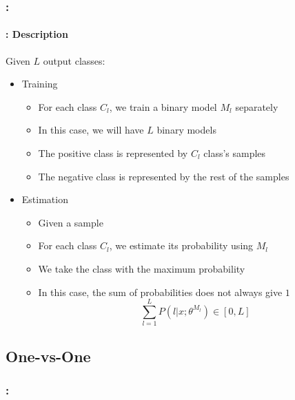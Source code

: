 \documentclass[xcolor=table]{beamer}
\begin{document}
\begin{frame}
	\frametitle{\insertshortsubtitle: \insertsection}
	\framesubtitle{\insertsubsection: Description}
	
	Given $L$ output classes:
	\begin{itemize}
		\item Training
		\begin{itemize}
			\item For each class $C_l$, we train a binary model $M_l$ separately
			\item In this case, we will have $L$ binary models
			\item The positive class is represented by $C_l$ class's samples
			\item The negative class is represented by the rest of the samples
		\end{itemize}
		\item Estimation
		\begin{itemize}
			\item Given a sample
			\item For each class $C_l$, we estimate its probability using $M_l$
			\item We take the class with the maximum probability
			\item In this case, the sum of probabilities does not always give $1$
			\[\sum_{l=1}^{L} P(l|x; \theta^{M_l}) \in [0, L]\]
		\end{itemize}
	\end{itemize}
	
\end{frame}

\subsection{One-vs-One}

\begin{frame}
	\frametitle{\insertshortsubtitle: \insertsection}
	\framesubtitle{\insertsubsection}
	
	
\end{frame}
\end{document}
